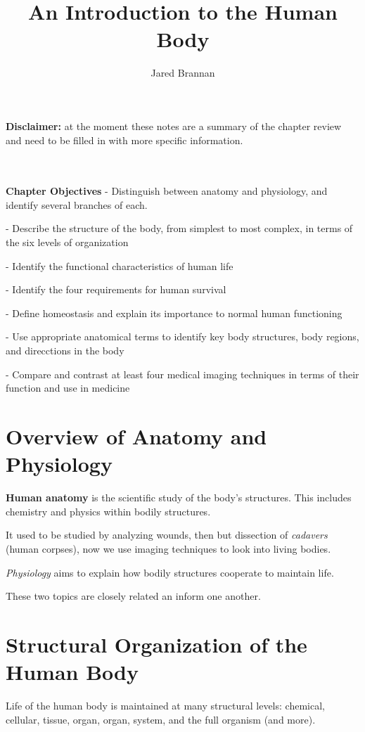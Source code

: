 \documentclass{article}
\title{An Introduction to the Human Body}
\author{Jared Brannan }
\theoremstyle{definition}
\begin{document}
\maketitle

\textbf{Disclaimer:} at the moment these notes are a summary of the chapter review and need to be filled in with more specific information.

\\~\\

\textbf{Chapter Objectives}
\indent- Distinguish between anatomy and physiology, and identify several branches of each.

- Describe the structure of the body, from simplest to most complex, in terms of the six levels of organization

- Identify the functional characteristics of human life

- Identify the four requirements for human survival

- Define homeostasis and explain its importance to normal human functioning

- Use appropriate anatomical terms to identify key body structures, body regions, and direcctions in the body

- Compare and contrast at least four medical imaging techniques in terms of their function and use in medicine

\section{Overview of Anatomy and Physiology}
 \textbf{Human anatomy}
is the scientific study of the body's structures. This includes chemistry and physics within bodily structures.

It used to be studied by analyzing wounds, then but dissection of \textit{cadavers} (human corpses), now we use imaging techniques to look into living bodies.


 \textit{Physiology}
aims to explain how bodily structures cooperate to maintain life.

These two topics are closely related an inform one another.

\section{Structural Organization of the Human Body}

Life of the human body is maintained at many structural levels: chemical, cellular, tissue, organ, organ, system, and the full organism (and more). 
\end{document}
